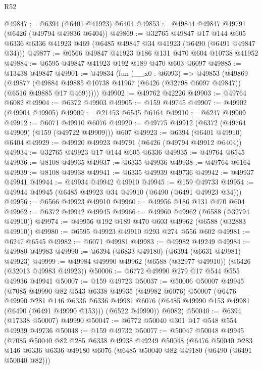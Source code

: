 \begin{lexlean}{R52}
\begin{coremodule}
@49847 := @6394 (@6401 @41923) @6404
@49853 := @49844 @49847 @49791 (@6426 (@49794 @49836 @6404))
@49869 := @32765
    @49847
    @17
    @144
    @605
    @6336
    @6336
    @41923
    @469
    (@6485 @49847 @34 @41923 (@6490 (@6491 @49847 @34)))
@49877 := @6566 @49847 @41923 @186 @131 @470 @604 @10738 @41952
@49884 := @6595 @49847 @41923 @192 @189 @470 @603 @6097
@49885 := @13438 @49847
@49901 := @49834
    (fun (__x0 : @6093) =>
    @49853
      (@49869
        (@49877
          (@49884 @49885 @10738 @41967 (@6426 (@32798 @6097 @49847)) (@6516 @49885 @17 @469)))))
@49902 := @49762 @42226
@49903 := @49764 @6082
@49904 := @6372 @49903
@49905 := @159 @49745
@49907 := @49902 (@49904 @49905)
@49909 := @21453 @6545 @6164
@49910 := @6247 @49909
@49912 := @6071 @49910 @6076
@49920 := @49775 @49912 (@6372 (@49764 @49909) (@159 (@49722 @49909))) @607
@49923 := @6394 (@6401 @49910) @6404
@49929 := @49920 @49923 @49791 (@6426 (@49794 @49912 @6404))
@49934 := @32765 @49923 @17 @144 @605 @6336
@49935 := @49764 @6545
@49936 := @8108 @49935
@49937 := @6335 @49936
@49938 := @49764 @6164
@49939 := @8108 @49938
@49941 := @6335 @49939 @49736
@49942 := @49937 @49941
@49944 := @49934 @49942 @49910
@49945 := @159 @49733
@49954 := @49944 @49945 (@6485 @49923 @34 @49910 (@6490 (@6491 @49923 @34)))
@49956 := @6566 @49923 @49910
@49960 := @49956 @186 @131 @470 @604
@49962 := @6372 @49942 @49945
@49966 := @49960 @49962 (@6588 (@32794 @49910))
@49974 := @49956 @192 @189 @470 @603 @49962 (@6588 (@32883 @49910))
@49980 := @6595 @49923 @49910 @293 @274 @556 @602
@49981 := @6247 @6545
@49982 := @6071 @49981
@49983 := @49982 @49249
@49984 := @49980 @49983
@49990 := @6394 (@6833 @49180) (@6394 (@6631 @49981) @49923)
@49999 := @49984 @49990 @49962 (@6588 (@32977 @49910)) (@6426 (@32013 @49983 @49923))
@50006 := @6772 @49990 @279 @17 @544 @555 @49936 @49941
@50007 := @159 @49723
@50037 := @50006
    @50007
    @49945
    (@7085
      @49990
      @82
      @543
      @6338
      @49935
      (@49982 @6076)
      @50007
      (@6476
        @49990
        @281
        @146
        @6336
        @6336
        @49981
        @6076
        (@6485 @49990 @153 @49981 (@6490 (@6491 @49990 @153)))
        (@6522 @49990))
      @6082)
@50040 := @6394 (@17338 @50007) @49990
@50047 := @6772 @50040 @301 @17 @548 @554 @49939 @49736
@50048 := @159 @49732
@50077 := @50047
    @50048
    @49945
    (@7085
      @50040
      @82
      @285
      @6338
      @49938
      @49249
      @50048
      (@6476
        @50040
        @283
        @146
        @6336
        @6336
        @49180
        @6076
        (@6485 @50040 @82 @49180 (@6490 (@6491 @50040 @82)))

\end{coremodule}
\end{lexlean}
